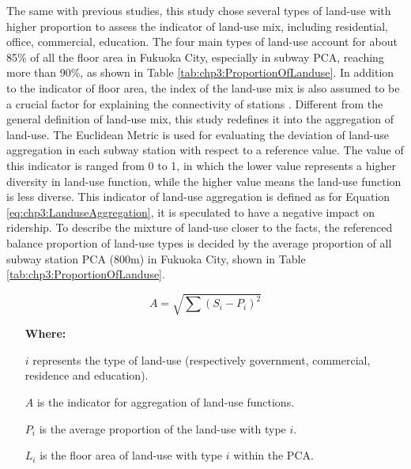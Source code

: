 %
The same with previous studies, this study chose several types of land-use with higher proportion to assess the indicator of land-use mix, including residential, office, commercial, education. The four main types of land-use account for about 85\% of all the floor area in Fukuoka City, especially in subway PCA, reaching more than 90\%, as shown in Table \ref{tab:chp3:ProportionOfLanduse}. In addition to the indicator of floor area, the index of the land-use mix is also assumed to be a crucial factor for explaining the connectivity of stations \cite{badoe2000transportation,cervero2004transit,frank2004obesity}. Different from the general definition of land-use mix, this study redefines it into the aggregation of land-use. The Euclidean Metric is used for evaluating the deviation of land-use aggregation in each subway station with respect to a reference value. The value of this indicator is ranged from 0 to 1, in which the lower value represents a higher diversity in land-use function, while the higher value means the land-use function is less diverse. This indicator of land-use aggregation is defined as for Equation \ref{eq:chp3:LanduseAggregation}, it is speculated to have a negative impact on ridership. To describe the mixture of land-use closer to the facts, the referenced balance proportion of land-use types is decided by the average proportion of all subway station PCA (800m) in Fukuoka City, shown in Table \ref{tab:chp3:ProportionOfLanduse}.

\begin{equation}
	A=\sqrt{\sum (S_i-P_i)^2}
	\label{eq:chp3:LanduseAggregation}
\end{equation}

\begin{enumerate}
	\item[\textbf{Where:}]
	\item[$i$] represents the type of land-use (respectively government, commercial, residence and education).
	\item[$A$] is the indicator for aggregation of land-use functions.
	\item[$P_i$] is the average proportion of the land-use with type $i$.
	\item[$L_i$] is the floor area of land-use with type $i$ within the PCA.
\end{enumerate}

